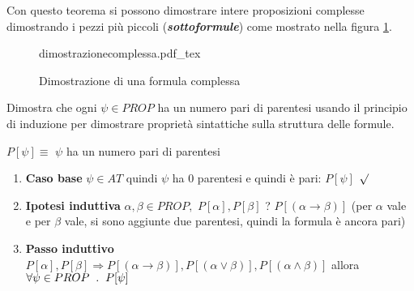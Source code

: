 \documentclass{article}
\newcommand{\incfig}[2][1]{%
  \def\svgwidth{#1\columnwidth}
  {#2.pdf_tex}
}
\theoremstyle{break}
\theoremstyle{break}
\theoremstyle{break}
\theoremstyle{break}
\begin{document}
Con questo teorema si possono dimostrare intere proposizioni complesse dimostrando i pezzi
più piccoli (\textbf{\emph{sottoformule}}) come mostrato nella figura \ref{fig:dimostrazionecomplessa}.

\label{ex:dimostrazioneComplessa}
\begin{figure}[ht]
  \centering
  \incfig[1]{dimostrazionecomplessa}
  \caption{Dimostrazione di una formula complessa}
  \label{fig:dimostrazionecomplessa}
\end{figure}

\pagebreak

\begin{exercise}
  \label{ex:parentesiPari}
  Dimostra che ogni \( \psi \in PROP \) ha un numero pari di parentesi usando
  il principio di induzione per dimostrare proprietà sintattiche sulla struttura
  delle formule.

  \( P[\psi] \equiv \) \( \psi \) ha un numero pari di parentesi
  \begin{enumerate}
    \item \textbf{Caso base} \( \psi \in AT \) quindi \( \psi \) ha 0 parentesi
      e quindi è pari: \( P[\psi] \) \( \surd \)
    \item \textbf{Ipotesi induttiva} \( \alpha , \beta \in PROP, \) \( P[\alpha ], P[\beta ] \)
      ? \( P[(\alpha \to \beta )] \) (per \( \alpha  \) vale e per \( \beta  \) vale, si sono
      aggiunte due parentesi, quindi la formula è ancora pari)
    \item \textbf{Passo induttivo} \( P[\alpha], P[\beta] \Rightarrow P[(\alpha \to \beta )], P[(\alpha \vee \beta )],
      P[(\alpha \wedge \beta)]\) allora \( \forall \psi \in PROP \hspace{2mm}.\hspace{2mm} P[\psi] \)

  \end{enumerate}
\end{exercise}
\end{document}
